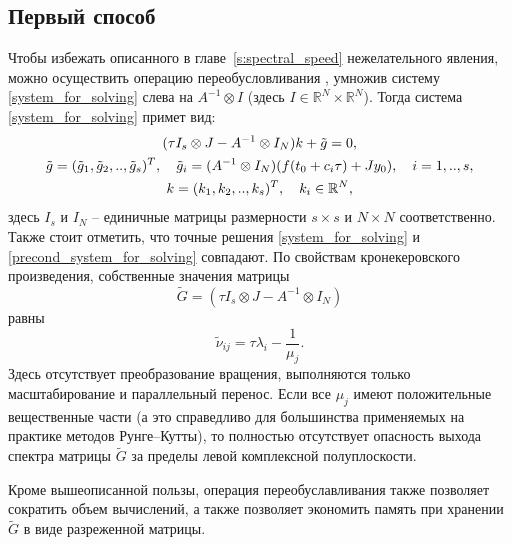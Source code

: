 \documentclass[a4paper,14pt]{extreport}
\begin{document}
  \subsection{Первый способ}
  \label{ss:precond_1}
  Чтобы  избежать описанного в главе~\ref{s:spectral_speed} нежелательного явления, можно осуществить операцию переобусловливания \cite{gomel},\cite{konf_may}  умножив систему \eqref{system_for_solving} слева на $A^{-1}\otimes I$ (здесь $I\in \mathbb{R}^N \times \mathbb{R}^N $). Тогда система \eqref{system_for_solving} примет вид:
\begin{gather}\label{precond_system_for_solving}
(\tau I_s\otimes J-A^{-1}\otimes I_N)k+\tilde g=0,\\
\notag \tilde g=(\tilde g_1,\tilde g_2,..,\tilde g_s)^T, \quad \tilde g_i=(A^{-1}\otimes I_N)(f(t_0+c_i \tau)+Jy_0), \quad i=1,..,s,\\
\notag k=(k_1,k_2,..,k_s)^T, \quad k_i \in \mathbb{R}^N,
\end{gather}
здесь $I_s$ и $I_N$ -- единичные матрицы размерности $s\times s$ и
$N \times N$ соответственно. Также стоит отметить, что точные
решения \eqref{system_for_solving} и
\eqref{precond_system_for_solving} совпадают. По свойствам
кронекеровского произведения, собственные значения
матрицы
$$\tilde G =(\tau I_s\otimes J-A^{-1}\otimes I_N) $$
равны
$$\tilde \nu_{ij} = \tau \lambda_i - \frac{1}{ \mu_j}.$$
Здесь отсутствует преобразование вращения, выполняются только
масштабирование и параллельный перенос.  Если все $\mu_j$ имеют
положительные вещественные части (а это справедливо для большинства
применяемых на практике методов Рунге--Кутты), то полностью
отсутствует опасность выхода спектра матрицы $\tilde G$ за пределы
левой комплексной полуплоскости. 

Кроме вышеописанной пользы, операция переобуславливания также позволяет сократить объем вычислений, а также позволяет экономить память при хранении $\tilde G$ в виде разреженной матрицы\cite{Bondar}.
  
\end{document}

